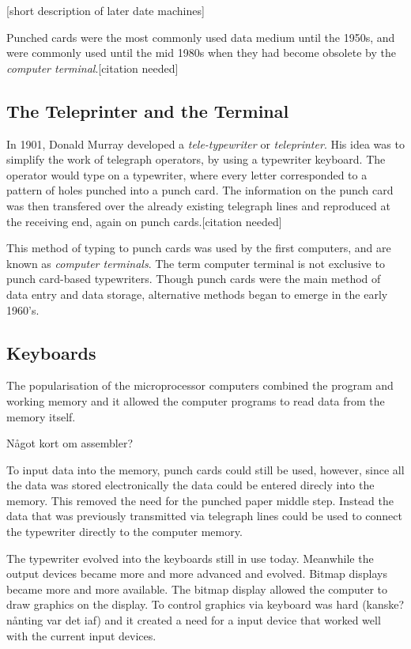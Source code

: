 [short description of later date machines]

Punched cards were the most commonly used data medium until the 1950s, and were commonly used until the mid 1980s when they had become obsolete by the \emph{computer terminal}.[citation needed]

\subsection{The Teleprinter and the Terminal}
In 1901, Donald Murray developed a \emph{tele-typewriter} or \emph{teleprinter}. His idea was to simplify the work of telegraph operators, by using a typewriter keyboard. The operator would type on a typewriter, where every letter corresponded to a pattern of holes punched into a punch card. The information on the punch card was then transfered over the already existing telegraph lines and reproduced at the receiving end, again on punch cards.[citation needed]

This method of typing to punch cards was used by the first computers, and are known as \emph{computer terminals}. The term computer terminal is not exclusive to punch card-based typewriters. Though punch cards were the main method of data entry and data storage, alternative methods began to emerge in the early 1960's. 


\subsection{Keyboards}

The popularisation of the microprocessor computers combined the program and working memory and it allowed the computer programs to read data from the memory itself. 

Något kort om assembler?

To input data into the memory, punch cards could still be used, however, since all the data was stored electronically the data could be entered direcly into the memory. This removed the need for the punched paper middle step. Instead the data that was previously transmitted via telegraph lines could be used to connect the typewriter directly to the computer memory. 

The typewriter evolved into the keyboards still in use today. Meanwhile the output devices became more and more advanced and evolved. Bitmap displays became more and more available. The bitmap display allowed the computer to draw graphics on the display. To control graphics via keyboard was hard (kanske? nånting var det iaf) and it created a need for a input device that worked well with the current input devices.

